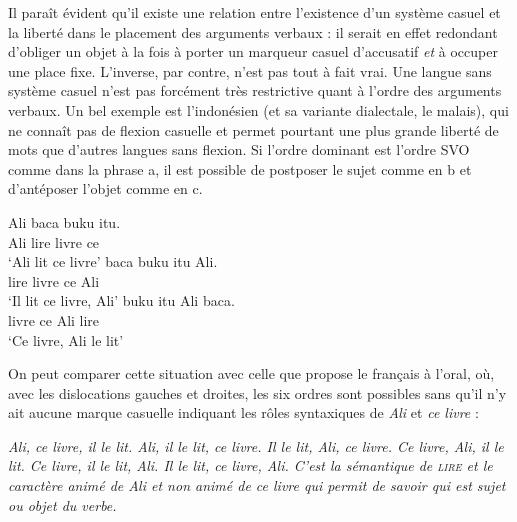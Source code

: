 {    \ea
    \z

    Il paraît évident qu’il existe une relation entre l’existence d’un système casuel et la liberté dans le placement des arguments verbaux : il serait en effet redondant d’obliger un objet à la fois à porter un marqueur casuel d’accusatif \textit{et} à occuper une place fixe. L’inverse, par contre, n’est pas tout à fait vrai. Une langue sans système casuel n’est pas forcément très restrictive quant à l’ordre des arguments verbaux. Un bel exemple est l'indonésien (et sa variante dialectale, le malais), qui ne connaît pas de flexion casuelle et permet pourtant une plus grande liberté de mots que d’autres langues sans flexion. Si l’ordre dominant est l’ordre SVO comme dans la phrase a, il est possible de postposer le sujet comme en b et d’antéposer l’objet comme en c.
    
    \ea\label{ex:bahasa}
    \ea
    \gll Ali baca buku itu.\\
    Ali lire    livre  ce\\
    \glt  ‘Ali lit ce livre’
    \ex
    \gll baca buku itu Ali.\\
    lire    livre  ce Ali\\
    \glt  ‘Il lit ce livre, Ali’
    \ex
    \gll buku itu Ali baca.\\
        livre ce Ali lire    \\
    \glt  ‘Ce livre, Ali le lit’
    \z
    \z

    On peut comparer cette situation avec celle que propose le français à l’oral, où, avec les dislocations gauches et droites, les six ordres sont possibles sans qu’il n’y ait aucune marque casuelle indiquant les rôles syntaxiques de \textit{Ali} et \textit{ce livre} :

    \ea
    \ea\itshape {Ali, ce livre, il le lit.}
    \ex\itshape {Ali, il le lit, ce livre.}
    \ex\itshape {Il le lit, Ali, ce livre.}
    \ex\itshape {Ce livre, Ali, il le lit.}
    \ex\itshape {Ce livre, il le lit, Ali.}
    \ex\itshape {Il le lit, ce livre, Ali.}
    \z
    \z
C'est la sémantique de \textsc{lire} et le caractère animé de \textit{Ali} et non animé de \textit{ce livre} qui permit de savoir qui est sujet ou objet du verbe.
}

